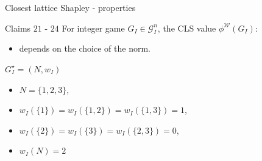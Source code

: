 \documentclass{beamer}
\begin{document}


\begin{frame}{Closest lattice Shapley - properties}

    \begin{block}{Claims $21$ - $24$}
        For integer game $G_I \in \mathcal{G}_I^n$, the CLS value $\phi^\mathcal{W}(G_I)$:
        \begin{itemize}
            \item depends on the choice of the norm.
        \end{itemize}
    \end{block}

    \begin{block}{$G_I^{\star}=(N,w_I)$}
        \begin{itemize}
            \item $N=\{1,2,3\}$,
            \item $w_I(\{1\})=w_I(\{1,2\})=w_I(\{1,3\})=1$,
            \item $w_I(\{2\})=w_I(\{3\})=w_I(\{2,3\})=0$,
            \item $w_I(N)=2$
        \end{itemize}
    \end{block}
\end{frame}


\end{document}
